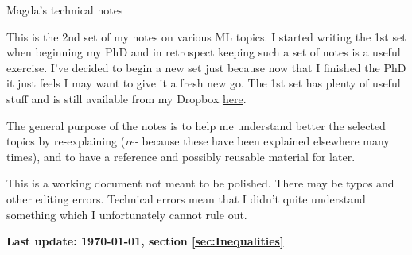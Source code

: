 \documentclass[a4paper]{article}
\numberwithin{equation}{section}
\theoremstyle{noparens}
\theoremstyle{noparensdef}
\theoremstyle{note}
\begin{document}
\setlength{\parindent}{0pt}
\setlength{\parskip}{1ex plus 0.5ex minus 0.2ex}

{\Huge Magda's technical notes}

This is the 2nd set of my notes on various ML topics.
I started writing the 1st set when beginning my PhD and in retrospect keeping such a set of notes is a useful exercise.
I've decided to begin a new set just because now that I finished the PhD it just feels I may want to give it a fresh new go.
The 1st set has plenty of useful stuff and is still available from my Dropbox \href{https://www.dropbox.com/sh/nx6goql4kmadyqp/AACAquwkTfm9fQhf3AKUC4pWa?dl=0}{here}.

The general purpose of the notes is to help me understand better the selected topics by re-explaining (\emph{re-} because these have been explained elsewhere many times), and to have a reference and possibly reusable material for later.

This is a working document not meant to be polished. There may be typos and other editing errors. 
Technical errors mean that I didn't quite understand something which I unfortunately cannot rule out.

\textbf{Last update: \today, section \ref{sec:Inequalities} }


\tableofcontents











\cleardoublepage
{}
\printindex
\end{document}
